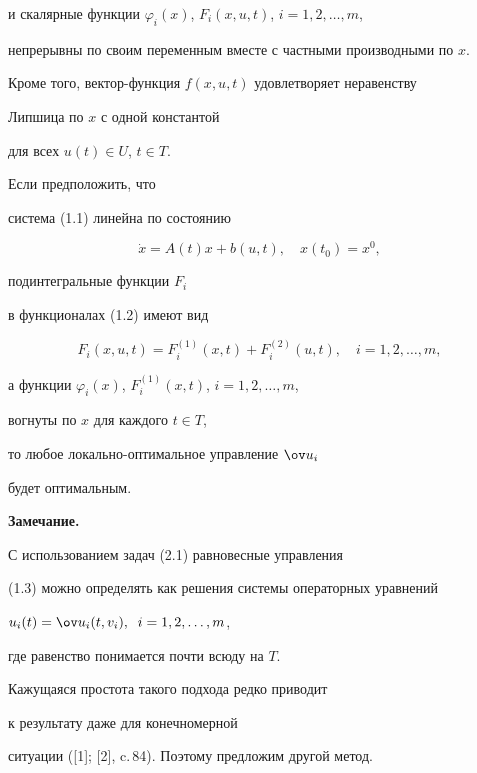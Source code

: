 и скалярные функции $\varphi_i(x)$, $F_i(x,u,t)$, $i=1,2,\dotsc ,m$,


непрерывны по своим переменным вместе с частными производными по $x$.


Кроме того, вектор-функция $f(x,u,t)$ удовлетворяет неравенству 


Липшица по $x$ с одной константой 


для всех $u(t)\in U$, $t\in T$.





Если предположить, что 


система (1.1) линейна по состоянию


$$


\Dot x=A(t)x+b(u,t),\quad x(t_{0})=x^{0},


$$


подинтегральные функции $F_{i}$


в функционалах (1.2) имеют вид


$$


F_{i}(x,u,t)=F_{i}^{(1)}(x,t)+F_{i}^{(2)}(u,t),\quad i=1,2,\dotsc, m,


$$


а функции $\varphi_{i}(x)$, $F_{i}^{(1)}(x,t)$, $i=1,2,\dotsc,m$,


вогнуты по $x$ для каждого $t\in T$,


то любое локально-оптимальное управление $\ov u_{i}$


будет оптимальным.


\medskip





{\bf Замечание.}


С использованием задач (2.1) равновесные управления 


(1.3) можно определять как решения системы операторных уравнений


$u_i(t)=\ov u_i(t,v_i), \;\; i=1,2,\dotsc,m$,


где равенство понимается почти всюду на $T$.


\medskip





Кажущаяся простота такого подхода редко приводит 


к результату даже для конечномерной 


ситуации ([1]; [2], c.\,84). Поэтому предложим другой метод.





